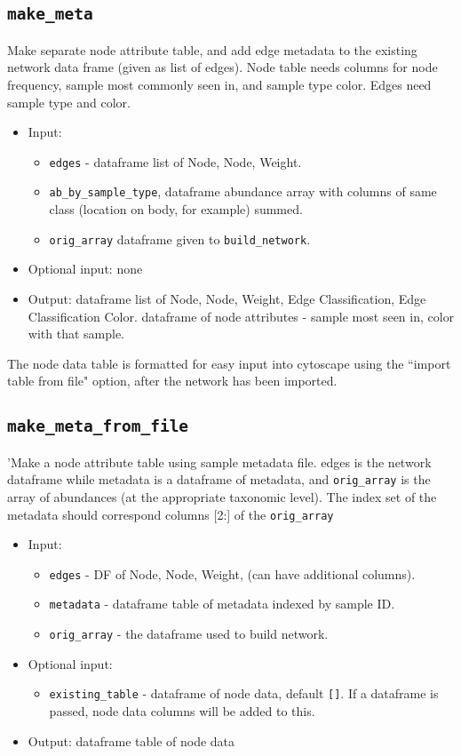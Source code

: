 \documentclass[10pt]{article}
\theoremstyle{definition}
\numberwithin{theorem}{section}
\numberwithin{definition}{section}
\numberwithin{lemma}{section}
\numberwithin{corollary}{section}
\numberwithin{clm}{section}
\numberwithin{rmk}{section}
\begin{document}
\cprotect \subsection{\verb|make_meta|}
Make separate node attribute table, and add edge metadata to the existing 
network data frame (given as list of edges). Node table needs columns for node frequency,
sample most commonly seen in, and sample type color. Edges need sample type and color.
\begin{itemize}
	\item Input: 
	\begin{itemize}
		\item \verb|edges| - dataframe list of Node, Node, Weight.
		\item \verb|ab_by_sample_type|, dataframe abundance array with columns of same class (location on body, for example) summed.
		\item \verb|orig_array| dataframe given to \verb|build_network|.
	\end{itemize}	
	\item Optional input: none
	\item Output: dataframe list of Node, Node, Weight, Edge Classification, Edge Classification Color. dataframe of node attributes - sample most seen in, color with that sample.
\end{itemize}

The node data table is formatted for easy input into cytoscape using the ``import table from file" option, after the network has been imported.


\cprotect \subsection{\verb|make_meta_from_file|}
'Make a node attribute table using sample metadata file. edges is the network dataframe
while metadata is a dataframe of metadata, and \verb|orig_array| is the array of abundances (at 
the appropriate taxonomic level). The index set of the metadata should correspond columns 
[2:] of the \verb|orig_array|

\begin{itemize}
	\item Input: 
	\begin{itemize}
		\item 	\verb|edges| -  DF of Node, Node, Weight, (can have additional columns).
		\item  \verb|metadata| - dataframe table of metadata indexed by sample ID.
		\item \verb|orig_array| - the dataframe used to build network. 
	\end{itemize}
	\item Optional input: 
	\begin{itemize}
		\item \verb|existing_table| - dataframe of node data, default \verb|[]|. If a dataframe is passed, node data columns will be added to this.
	\end{itemize}
	\item Output: dataframe table of node data
\end{itemize}
\end{document}

